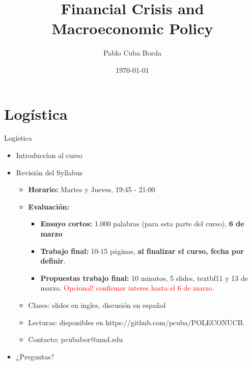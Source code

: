 \documentclass{beamer}
\title{Financial Crisis and Macroeconomic Policy}
\date{\today}
\author{Pablo Cuba Borda}
\institute{Universidad Católica Boliviana San Pablo // Semestre I, 2025}
\begin{document}
  \maketitle

\section{Logística}
\begin{frame}{Logística}

	\begin{itemize}
		\item Introduccíon al curso
		\item Revisión del Syllabus
		\begin{itemize}
			\item 	\textbf{Horario:} Martes y Jueves, 19:45 - 21:00 \\
			\item \textbf{Evaluación: }
				\begin{itemize}
				\item 	\textbf{Ensayo cortos:} 1.000 palabras (para esta parte del curso), \textbf{6 de marzo}
				\item 	\textbf{Trabajo final:} 10-15 páginas, \textbf{al finalizar el curso, fecha por definir}. 
				\item 	\textbf{Propuestas trabajo final:} 10 minutos, 5 slides, textbf{11 y 13 de marzo}. \textcolor{red}{Opcional! confirmar interes hasta el 6 de marzo}.
			\end{itemize}
			\item Clases: slides en ingles, discusión en español	
			\item Lecturas: disponibles en  https://github.com/pcuba/POLECONUCB.
			\item Contacto: pcubabor@umd.edu 
		\end{itemize}
		\item ¿Preguntas?

	\end{itemize}

	

\end{frame}
\end{document}
